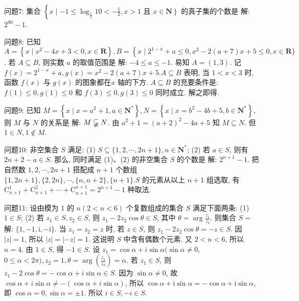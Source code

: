问题7: 集合 $\left\{x \mid-1 \leqslant \log _{\frac{1}{x}} 10<-\frac{1}{2}, x>1\right.$ 且 $\left.x \in \mathbf{N}\right\}$ 的真子集的个数是
解: $2^{90}-1$.



问题8: 已知 $A=\left\{x \mid x^2-4 x+3<0, x \in \mathbf{R}\right\}, B=\left\{x \mid 2^{1-x}+a \leqslant 0, x^2-\right. 2(a+7) x+5 \leqslant 0, x \in \mathbf{R}\}$. 若 $A \subseteq B$, 则实数 $a$ 的取值范围是
解: $-4 \leqslant a \leqslant-1$. 易知 $A=(1,3)$. 记 $f(x)=2^{1-x}+a, g(x)=x^2-2(a+7) x+5 . A \subseteq B$ 表明, 当 $1<x<3$ 时, 函数 $f(x)$ 与 $g(x)$ 的图象都在$x$ 轴的下方.
$A \subseteq B$ 的充要条件是: $f(1) \leqslant 0, g(1) \leqslant 0$ 和 $f(3) \leqslant 0, g(3) \leqslant 0$ 同时成立.
解之即得.



问题9: 已知 $M=\left\{x \mid x=a^2+1, a \in \mathbf{N}^*\right\}, N=\left\{x \mid x=b^2-4 b+5, b \in \mathbf{N}^*\right\}$, 则 $M$ 与 $N$ 的关系是
解: $M \varsubsetneqq N$. 由 $a^2+1=(a+2)^2-4 a+5$ 知 $M \subseteq N$. 但 $1 \in N, 1 \notin M$.



问题10: 非空集合 $S$ 满足:
(1) $S \subseteq\{1,2, \cdots, 2 n+1\}, n \in \mathbf{N}^*$;
(2) 若 $a \in S$, 则有 $2 n+2-a \in S$.
那么, 同时满足 (1)、(2) 的非空集合 $S$ 的个数是
解: $2^{n+1}-1$. 把自然数 $1,2, \cdots, 2 n+1$ 搭配成 $n+1$ 个数组 $\{1,2 n+1\}, \{2,2 n\}, \cdots,\{n, n+2\},\{n+1\} . S$ 的元素从以上 $n+1$ 组选取, 有 $\mathrm{C}_{n+1}^1+ \mathrm{C}_{n+1}^2+\cdots+\mathrm{C}_{n+1}^{n+1}=2^{n+1}-1$ 种取法.



问题11: 设由模为 1 的 $n(2<n<6)$ 个复数组成的集合 $S$ 满足下面两条:
(1) $1 \in S$;
(2) 若 $z_1 \in S, z_2 \in S$, 则 $z_1-2 z_2 \cos \theta \in S$, 其中 $\theta=\arg \frac{z_1}{z_2}$.
则集合 $S=$
解: $\{1,-1, \mathrm{i},-\mathrm{i}\}$. 当 $z_1=z_2=z$ 时, 若 $z \in S$, 则 $z_1-2 z_2 \cos \theta=-z \in S$. 因 $|z|=1$, 所以 $|z|=|-z|=1$. 这说明 $S$ 中含有偶数个元素.
又 $2<n<6$, 所以 $n=4$. 由 $1 \in S$, 得 $-1 \in S$. 设 $z_1=\cos \alpha+i \sin \alpha(\sin \alpha \neq 0$, $0 \leqslant \alpha<2 \pi), z_2=1, \theta=\arg \left(\frac{z_1}{z_2}\right)=\alpha$. 若 $z_1 \in S$, 则 $z_1-2 \cos \theta=-\cos \alpha+i \sin \alpha \in S$. 因为 $\sin \alpha \neq 0$, 故 $\cos \alpha+i \sin \alpha \neq-(\cos \alpha+i \sin \alpha)$, 所以 $\cos \alpha+\mathrm{i} \sin \alpha=-\cos \alpha+\mathrm{i} \sin \alpha$, 即 $\cos \alpha=0, \sin \alpha= \pm 1$. 所以 $i \in S,-i \in S$.



